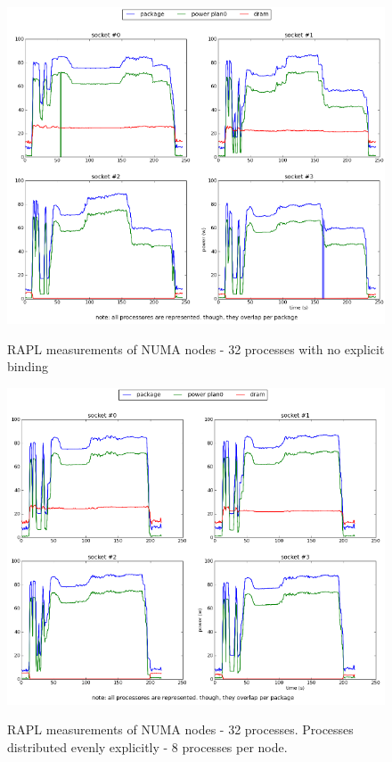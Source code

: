 \begin{figure}[h!]
  \centering
    \includegraphics[width=150mm]{"img/numa/32proc"}
    \label{fig:nf_ss}
    \caption{RAPL measurements of NUMA nodes - 32 processes with no explicit
binding}
\end{figure}


\begin{figure}[h!]
  \centering
    \includegraphics[width=150mm]{"img/numa/32proc_explicitly_distributed"}
    \label{fig:nf_ss}
    \caption{RAPL measurements of NUMA nodes - 32 processes. Processes 
distributed evenly explicitly - 8 processes per node. }
\end{figure}




